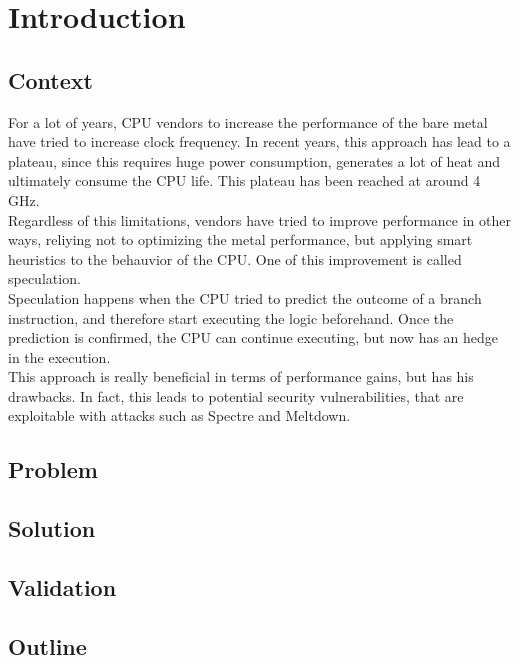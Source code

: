\chapter{Introduction}
\label{cha:introduction}

\section{Context}
\label{cha:Context}

For a lot of years, CPU vendors to increase the performance of the bare metal
have tried to increase clock frequency. In recent years, this approach has lead
to a plateau, since this requires huge power consumption, generates a lot of
heat and ultimately consume the CPU life. This plateau has been reached at around
4 GHz. \\ Regardless of this limitations, vendors have tried to improve performance
in other ways, reliying not to optimizing the metal performance, but applying smart
heuristics to the behauvior of the CPU. One of this improvement is called
speculation. \\ Speculation happens when the CPU tried to predict the outcome of
a branch instruction, and therefore start executing the logic beforehand. Once the
prediction is confirmed, the CPU can continue executing, but now has an hedge in
the execution.\\ This approach is really beneficial in terms of performance gains,
but has his drawbacks. In fact, this leads to potential security vulnerabilities,
that are exploitable with attacks such as Spectre and Meltdown.

\section{Problem}
\label{cha:problem}

\section{Solution}
\label{cha:solution}

\section{Validation}
\label{cha:validation}

\section{Outline}
\label{cha:outline}